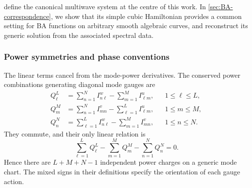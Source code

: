  define the canonical multiwave
system at the centre of this work. In \cref{sec:BA-correspondence},
we show that its simple cubic Hamiltonian provides a common setting
for BA functions on arbitrary smooth algebraic curves, and reconstruct
its generic solution from the associated spectral data.

\subsubsection{Power symmetries and phase conventions}
\label{sec:canonical-phase-gauges}

The linear terms cancel from the mode-power derivatives. The conserved
power combinations generating diagonal mode gauges are
\begin{equation}\label{eq:canonical-charges}
\begin{aligned}
 Q_\ell^L&=\sum_{n=1}^{N}I^w_{n\ell}
             -\sum_{m=1}^{M}I^u_{\ell m},&&1\leq\ell\leq L,\\
 Q_m^M&=\sum_{n=1}^{N}I^v_{mn}
             -\sum_{\ell=1}^{L}I^u_{\ell m},&&1\leq m\leq M,\\
 Q_n^N&=\sum_{\ell=1}^{L}I^w_{n\ell}
             -\sum_{m=1}^{M}I^v_{mn},&&1\leq n\leq N.
\end{aligned}
\end{equation}
They commute, and their only linear relation is
\begin{equation}\label{eq:canonical-charge-relation}
 \sum_{\ell=1}^{L}Q_\ell^L-\sum_{m=1}^{M}Q_m^M
                         -\sum_{n=1}^{N}Q_n^N=0.
\end{equation}
Hence there are $L+M+N-1$ independent power charges on a generic
mode chart. The mixed signs in their definitions specify the
orientation of each gauge action.

